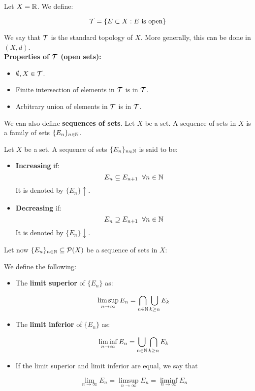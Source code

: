 \begin{fexample}
    Let $X = \mathbb{R}$. We define:

    $$\mathcal{T} = \{E \subset X: E \text{ is open}\}$$

    We say that $\mathcal{T}$ is the standard topology of $X$. More generally, this can be
    done in  $(X, d)$.\\

    \textbf{Properties of $\mathcal{T}$ (open sets):}
    \begin{itemize}
        \item $\emptyset, X \in \mathcal{T}$.
        \item Finite intersection of elements in $\mathcal{T}$ is in $\mathcal{T}$.
        \item Arbitrary union of elements in $\mathcal{T}$ is in $\mathcal{T}$.
    \end{itemize}
\end{fexample}

\vspace{1em}

We can also define \textbf{sequences of sets}. Let $X$ be a set. A sequence of sets in $X$
is a family of sets $\{E_n\}_{n \in \mathbb{N}}$.

\begin{fdefinition}
    Let $X$ be a set. A sequence of sets $\{E_n\}_{n \in \mathbb{N}}$ is said to be:
    \begin{itemize}
        \item \textbf{Increasing} if:
        $$E_n \subseteq E_{n+1} \; \; \forall n \in \mathbb{N}$$
        It is denoted by $\{E_n\} \uparrow$.

        \item \textbf{Decreasing} if:
        $$E_n \supseteq E_{n+1} \; \; \forall n \in \mathbb{N}$$
        It is denoted by $\{E_n\} \downarrow$.
    \end{itemize}
\end{fdefinition}

\vspace{1em}

Let now $\{E_n\}_{n \in \mathbb{N}} \subseteq \mathcal{P}(X)$ be a sequence of sets in $X$:

\begin{fdefinition}
    We define the following:
    \begin{itemize}
        \item The \textbf{limit superior} of $\{E_n\}$ as:
        
        $$\limsup_{n \to \infty} E_n = \bigcap_{n \in \mathbb{N}} \bigcup_{k \geq n} E_k$$

        \item The \textbf{limit inferior} of $\{E_n\}$ as:
        
        $$\liminf_{n \to \infty} E_n = \bigcup_{n \in \mathbb{N}} \bigcap_{k \geq n} E_k$$

        \item If the limit superior and limit inferior are equal, we say that
        
        $$\lim_{n \to \infty} E_n = \limsup_{n \to \infty} E_n = \liminf_{n \to \infty} E_n$$
    \end{itemize}
\end{fdefinition}

